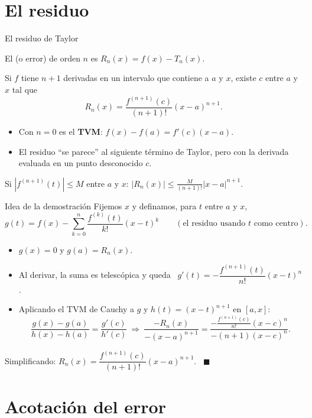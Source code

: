 \documentclass[10pt,aspectratio=169]{beamer}
\begin{document}
\section{El residuo}

\begin{frame}{El residuo de Taylor}
  \begin{definicion}
    El  (o error) de orden $n$ es \quad $R_n(x)=f(x)-T_n(x)$.
  \end{definicion}
  \begin{teorema}
    Si $f$ tiene $n+1$ derivadas en un intervalo que contiene a $a$ y $x$, existe $c$ entre $a$ y $x$ tal que
    \[ R_n(x)=\frac{f^{(n+1)}(c)}{(n+1)!}(x-a)^{n+1}. \]
  \end{teorema}
  \begin{itemize}
    \item Con $n=0$ es el \textbf{TVM}: $f(x)-f(a)=f'(c)(x-a)$.
    \item El residuo ``se parece'' al siguiente término de Taylor, pero con la derivada evaluada en un punto desconocido $c$.
  \end{itemize}
  \begin{teorema}
    Si $|f^{(n+1)}(t)|\le M$ entre $a$ y $x$: \quad $\displaystyle|R_n(x)|\le\frac{M}{(n+1)!}|x-a|^{n+1}$.
  \end{teorema}
\end{frame}

\begin{frame}{Idea de la demostración}
  Fijemos $x$ y definamos, para $t$ entre $a$ y $x$,
  \[ g(t)=f(x)-\sum_{k=0}^n\frac{f^{(k)}(t)}{k!}(x-t)^k\qquad(\text{el residuo usando } t \text{ como centro}). \]
  \begin{itemize}
    \item $g(x)=0$ y $g(a)=R_n(x)$.
    \item Al derivar, la suma es telescópica y queda \ $g'(t)=-\dfrac{f^{(n+1)}(t)}{n!}(x-t)^n$.
    \item Aplicando el TVM de Cauchy a $g$ y $h(t)=(x-t)^{n+1}$ en $[a,x]$:
      \[ \frac{g(x)-g(a)}{h(x)-h(a)}=\frac{g'(c)}{h'(c)}\ \Rightarrow\ \frac{-R_n(x)}{-(x-a)^{n+1}}=\frac{-\frac{f^{(n+1)}(c)}{n!}(x-c)^n}{-(n+1)(x-c)^n}. \]
  \end{itemize}
  Simplificando: $R_n(x)=\dfrac{f^{(n+1)}(c)}{(n+1)!}(x-a)^{n+1}$. \ $\blacksquare$
\end{frame}

\section{Acotación del error}
\end{document}

